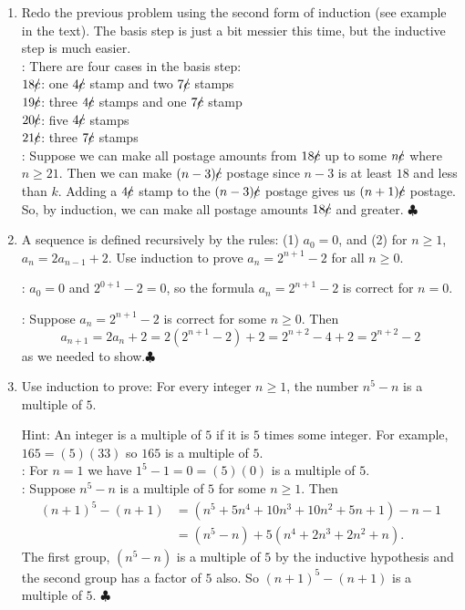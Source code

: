 \documentclass[11pt]{amsart}
\begin{document}
\begin{enumerate}
\item  Redo the previous problem using the second form of induction (see example in the text). The basis step is just a bit messier this time, but the inductive step is much easier.\\[3pt]

{\color{blue}
: There are four cases in the basis step:\\
$18c\kern -5pt/$: one $4 c\kern -5pt/$ stamp and two  $7c\kern -5pt/$ stamps \\
$19c\kern -5pt/$: three $4 c\kern -5pt/$ stamps and one $7c\kern -5pt/$ stamp\\
$20c\kern -5pt/$: five $4 c\kern -5pt/$ stamps \\
$21c\kern -5pt/$: three $7c\kern -5pt/$ stamps \\[3pt]

: Suppose we can make all postage amounts from $18c\kern -5pt/$ up to some
$nc\kern -5pt/$ where $n\geq 21$. Then we can make $(n-3)c\kern -5pt/$ postage since $n-3$ is at least $18$
and less than $k$. Adding a $4 c\kern -5pt/$ stamp to the $(n-3)c\kern -5pt/$ postage gives us $(n+1)c\kern -5pt/$
postage. So, by induction, we can make all postage amounts $18c\kern -5pt/$ and greater. $\clubsuit$\\[5pt]
}

\item A sequence is defined recursively by the rules: (1) $a_{0} = 0$, and (2) for $n\geq 1$, $a_{n}= 2a_{n-1}+ 2$. Use induction to prove $a_{n}= 2^{n+1}-2$ for all $n\geq 0$.\\[3pt]
{\color{blue}
: $a_{0}=0$ and $2^{0+1}-2 = 0$, so the formula $a_{n}= 2^{n+1}-2$ is correct for $n =0$.

: Suppose $a_{n}= 2^{n+1}-2$ is correct for some $n\geq 0$. Then\\
\[
a_{n+1} = 2a_{n}+2 = 2(2^{n+1}-2) + 2 = 2^{n+2} - 4 +2 = 2^{n+2} - 2
\]
as we needed to show.$\clubsuit$\\[5pt]
}

\item Use induction to prove: For every integer $n\geq 1$, the number $n^5-n$ is a multiple of $5$.

Hint: An integer is a multiple of $5$ if it is $5$ times some integer. For example,
$165 = (5)(33)$ so $165$ is a multiple of $5$.\\[3pt]

{\color{blue}
: For  $n=1$  we have  $1^5 - 1 = 0 = (5)(0)$ is a multiple of
 $5$.\\
: Suppose  $n^5-n$ 
is a multiple of $5$ for some $n\geq 1$.
Then 
\begin{align*} 
(n+1)^5 - (n+1) &= (n^5 +5n^4 +10n^3+10n^2+5n+1) - n - 1\\
&= (n^5 - n) + 5(n^4  +2n^3+2n^2+n).
\end{align*}
The first group, $(n^5-n)$ 
 is a multiple of $5$ by the inductive hypothesis
and the second group has a factor of $5$ also. So
$(n+1)^5 - (n+1)$  is a multiple of $5$. $\clubsuit$\\[5pt]
}


\end{enumerate}
\end{document}
